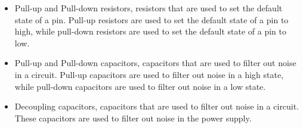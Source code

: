 \documentclass{article}
\begin{document}
\begin{itemize}
      \item Pull-up and Pull-down resistors, resistors that are used to set the default state of a pin. Pull-up resistors are used to set the default state of a pin to high, while pull-down resistors are used to set the default state of a pin to low.
      \item Pull-up and Pull-down capacitors, capacitors that are used to filter out noise in a circuit. Pull-up capacitors are used to filter out noise in a high state, while pull-down capacitors are used to filter out noise in a low state.
      \item Decoupling capacitors, capacitors that are used to filter out noise in a circuit. These capacitors are used to filter out noise in the power supply.
\end{itemize}


\printbibliography
\end{document}
